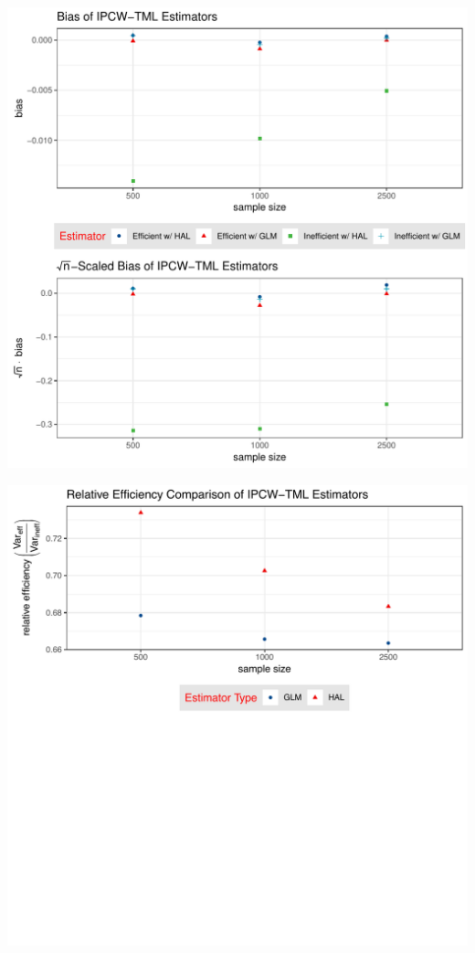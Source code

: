 \documentclass[landscape,a0paper,fontscale=0.285]{baposter} %
\begin{document}
\begin{poster}
{\begin{multicols}{2}
\begin{center}
\vspace*{-0.5cm}
\includegraphics[scale=0.37]{bias_composed_plot}
\end{center}

\begin{center}
\includegraphics[scale=0.39]{rel_eff_composed_plot}
\end{center}


\end{multicols}}
\end{poster}
\end{document}

